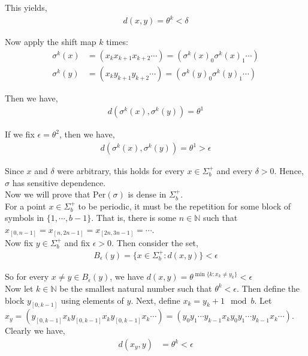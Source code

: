 \documentclass[12pt]{article}
\begin{document}
This yields,
\begin{align*}
d(x, y) = \theta^k < \delta
\end{align*}

Now apply the shift map $k$ times:
\begin{align*}
\sigma^{k}(x) &= (x_kx_{k+1}x_{k+2}\cdots) = (\sigma^k(x)_0\sigma^k(x)_1\cdots)\\
\sigma^{k}(y) &= (x_ky_{k+1}y_{k+2}\cdots) = (\sigma^k(y)_0\sigma^k(y)_1\cdots)
\end{align*}

Then we have,
\begin{align*}
d(\sigma^{k}(x), \sigma^{k}(y)) = \theta^1
\end{align*}

If we fix $\epsilon = \theta^2$, then we have,
\begin{align*}
d(\sigma^{k}(x), \sigma^{k}(y)) = \theta^1 > \epsilon
\end{align*}

Since $x$ and $\delta$ were arbitrary, this holds for every $x \in \Sigma_b^+$ and every $\delta > 0$. Hence, $\sigma$ has sensitive dependence.\\

Now we will prove that $\text{Per}(\sigma)$ is dense in $\Sigma_b^+$.\\

For a point $x \in \Sigma_b^+$ to be periodic, it must be the repetition for some block of symbols in $\{1, \cdots, b-1\}$. That is, there is some $n \in \mathbb{N}$ such that $x_{[0, n-1]} = x_{[n, 2n-1]} = x_{[2n, 3n-1]} = \cdots$.\\

Now fix $y \in \Sigma_b^+$ and fix $\epsilon > 0$. Then consider the set,
\begin{align*}
B_{\epsilon}(y) = \{x \in \Sigma_b^+: d(x, y)\} < \epsilon
\end{align*}

So for every $x \neq y \in B_{\epsilon}(y)$, we have $d(x, y) = \theta^{\min \{k: x_k \neq y_k\}} < \epsilon$\\

Now let $k \in \mathbb{N}$ be the smallest natural number such that $\theta^k < \epsilon$. Then define the block $y_{[0, k-1]}$ using elements of $y$. Next, define $x_k = y_k + 1 \mod b$. Let $x_y = (y_{[0, k-1]}x_ky_{[0, k-1]}x_ky_{[0, k-1]}x_k\cdots) = (y_0y_1\cdots y_{k-1}x_ky_0y_1\cdots y_{k-1}x_k\cdots)$. Clearly we have,
\begin{align*}
d(x_y, y) &= \theta^k < \epsilon
\end{align*}
\end{document}

